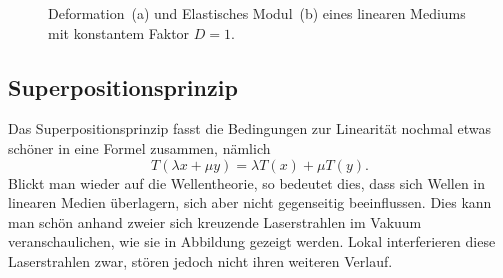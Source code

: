 \begin{figure}
    \centering
    \hfill
    \caption{Deformation~(a) und Elastisches Modul~(b) eines linearen Mediums mit konstantem Faktor $D = 1$.}
\end{figure}

\subsection{Superpositionsprinzip}\label{particles:section:lin-medium:superposition}
Das Superpositionsprinzip fasst die Bedingungen zur Linearität nochmal etwas schöner in eine Formel zusammen, 
nämlich
\[
    T(\lambda x + \mu y)
    = 
    \lambda T(x) 
    + 
    \mu T(y).
\]
Blickt man wieder auf die Wellentheorie, so bedeutet dies, dass sich Wellen in linearen Medien überlagern, sich aber nicht gegenseitig beeinflussen.
Dies kann man schön anhand zweier sich kreuzende Laserstrahlen im Vakuum veranschaulichen, 
wie sie in Abbildung  gezeigt werden.
Lokal interferieren diese Laserstrahlen zwar, stören jedoch nicht ihren weiteren Verlauf. 

